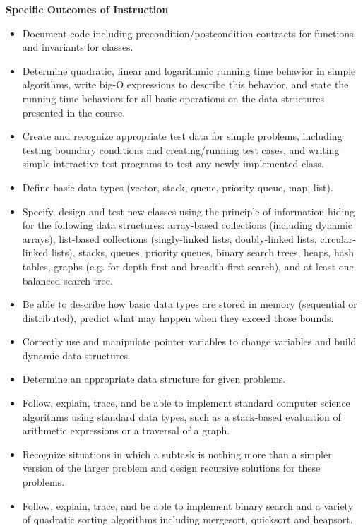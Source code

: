 {    \noindent \textbf{Specific Outcomes of Instruction}
    \begin{itemize}
        \item Document code including precondition/postcondition contracts for functions and invariants for classes.
        \item Determine quadratic, linear and logarithmic running time behavior in simple algorithms, write big-O expressions to describe this behavior, and state the running time behaviors for all basic operations on the data structures presented in the course.
        \item Create and recognize appropriate test data for simple problems, including testing boundary conditions and creating/running test cases, and writing simple interactive test programs to test any newly implemented class.
        \item Define basic data types (vector, stack, queue, priority queue, map, list).
        \item Specify, design and test new classes using the principle of information hiding for the following data structures: array-based collections (including dynamic arrays), list-based collections (singly-linked lists, doubly-linked lists, circular-linked lists), stacks, queues, priority queues, binary search trees, heaps, hash tables, graphs (e.g. for depth-first and breadth-first search), and at least one balanced search tree.
        \item Be able to describe how basic data types are stored in memory (sequential or distributed), predict what may happen when they exceed those bounds.
        \item Correctly use and manipulate pointer variables to change variables and build dynamic data structures.
        \item Determine an appropriate data structure for given problems.
        \item Follow, explain, trace, and be able to implement standard computer science algorithms using standard data types, such as a stack-based evaluation of arithmetic expressions or a traversal of a graph.
        \item Recognize situations in which a subtask is nothing more than a simpler version of the larger problem and design recursive solutions for these problems.
        \item Follow, explain, trace, and be able to implement binary search and a variety of quadratic sorting algorithms including mergesort, quicksort and heapsort.
    \end{itemize}
    
}
